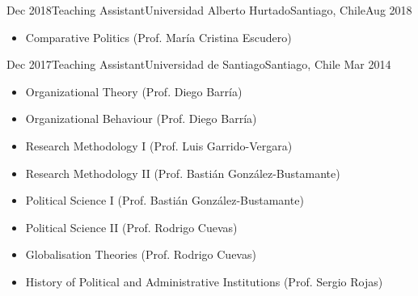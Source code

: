 





\begin{experiences}
  \experience
    {Dec 2018}{Teaching Assistant}{Universidad Alberto Hurtado}{Santiago, Chile}{Aug 2018}
    {\begin{itemize}
    \item Comparative Politics {\small (Prof. María Cristina Escudero)}
    \end{itemize}}
    {}
\end{experiences}
\vspace{-2mm}

\begin{experiences}
  \emptySeparator 
  \experience 
    {Dec 2017}{Teaching Assistant}{Universidad de Santiago}{Santiago, Chile} {Mar 2014}
    {\begin{itemize}
    \item Organizational Theory {\small (Prof. Diego Barría)}
    \item Organizational Behaviour {\small (Prof. Diego Barría)}
    \item Research Methodology I {\small (Prof. Luis Garrido-Vergara)}
    \item Research Methodology II {\small (Prof. Bastián González-Bustamante)}
    \item Political Science I {\small (Prof. Bastián González-Bustamante)}
    \item Political Science II {\small (Prof. Rodrigo Cuevas)}
	\item Globalisation Theories {\small (Prof. Rodrigo Cuevas)}
	\item History of Political and Administrative Institutions {\small (Prof. Sergio Rojas)}
    \end{itemize}}
    {}
\end{experiences}
\vspace{-2mm}

